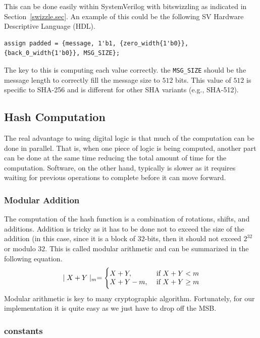 \documentclass{article}
\begin{document}
This can be done easily within SystemVerilog with bitswizzling as
indicated in Section~\ref{swizzle.sec}.
An example of this could be the following SV Hardware Descriptive
Language (HDL).
\begin{verbatim}
assign padded = {message, 1'b1, {zero_width{1'b0}},  {back_0_width{1'b0}}, MSG_SIZE};
\end{verbatim}
The key to this is computing each value correctly.  the
\verb!MSG_SIZE! should be the message length to correctly fill the
message size to $512$ bits.  This value of $512$ is specific to
SHA-256 and is different for other SHA variants (e.g., SHA-512).


\subsection{Hash Computation}

The real advantage to using digital logic is that much of the
computation can be done in parallel.  That is, when one piece of logic
is being computed, another part can be done at the same time reducing
the total amount of time for the computation.  Software, on the other
hand, typically is slower as it requires waiting for previous
operations to complete before it can move forward.

\subsubsection{Modular Addition}
\label{modular.sec}

The computation of the hash function is a combination of rotations,
shifts, and additions.  Addition is tricky as it has to be done not to
exceed the size of the addition (in this case, since it is a block of
$32$-bits, then it should not exceed $2^{32}$ or modulo $32$.  This is
called modular arithmetic and can be summarized in the following equation.
\begin{eqnarray*}
  \mid X+Y \mid_m = \Biggl\{
   \begin{array}{@{}ll@{}}
      X+Y,      & \text{ if $X+Y < m$}  \\
      X+Y-m,    & \text{ if $X+Y \geq m$} 
   \end{array}
\end{eqnarray*}  
Modular arithmetic is key to many cryptographic algorithm.
Fortunately, for our implementation it is quite easy as we just have
to drop off the MSB.

\subsubsection{constants}
\label{constants.sec}
\end{document}
